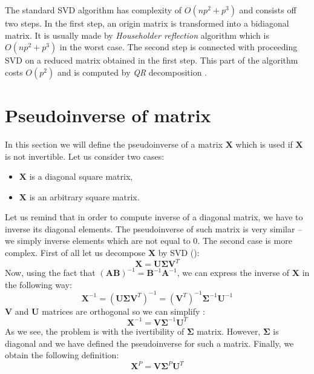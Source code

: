 \documentclass[english,a4paper,twoside]{ppfcmthesis}
\begin{document}
\begin{appendices}
The standard SVD algorithm has complexity of $O(np^2+p^3)$ and consists off two steps. In the first step, an origin matrix is transformed into a bidiagonal matrix. It is usually made by \textit{Householder reflection} algorithm which is $O(np^2+p^3)$ in the worst case. The second step is connected with proceeding SVD on a reduced matrix obtained in the first step. This part of the algorithm costs $O(p^2)$ and is computed by \textit{QR} decomposition \citep{Banerjee}. 

\newpage
\section{Pseudoinverse of matrix}\label{app:pseudo}

In this section we will define the pseudoinverse of a matrix $\boldsymbol{X}$ which is used if $\boldsymbol{X}$ is not invertible. Let us consider two cases: 
\begin{itemize}
    \item $\boldsymbol{X}$ is a diagonal square matrix,
    \item $\boldsymbol{X}$ is an arbitrary square matrix.
\end{itemize}
Let us remind that in order to compute inverse of a diagonal matrix, we have to inverse its diagonal elements. The pseudoinverse of such matrix is very similar -- we simply inverse elements which are not equal to $0$. The second case is more complex. First of all let us decompose $\boldsymbol{X}$ by SVD ():
\begin{equation}
    \boldsymbol{X}=\boldsymbol{U}\boldsymbol{\Sigma}{\boldsymbol{V}^T}
\end{equation}
Now, using the fact that $(\boldsymbol{A}\boldsymbol{B})^{-1}=\boldsymbol{B}^{-1}\boldsymbol{A}^{-1}$, we can express the inverse of $\boldsymbol{X}$ in the following way:
\begin{equation}\label{eq:invert}
    \boldsymbol{X}^{-1}=(\boldsymbol{U}\boldsymbol{\Sigma}{\boldsymbol{V}^T})^{-1}=(\boldsymbol{V}^T)^{-1}{\boldsymbol{\Sigma}}^{-1}\boldsymbol{U}^{-1}
\end{equation}
$\boldsymbol{V}$ and $\boldsymbol{U}$ matrices are orthogonal so we can simplify :
\begin{equation}
    \boldsymbol{X}^{-1}=\boldsymbol{V}{\boldsymbol{\Sigma}}^{-1}\boldsymbol{U}^T
\end{equation}
As we see, the problem is with the ivertibility of $\boldsymbol{\Sigma}$ matrix. However, $\boldsymbol{\Sigma}$ is diagonal and we have defined the pseudoinverse for such a matrix. Finally, we obtain the following definition:
\begin{equation}
    \boldsymbol{X}^P=\boldsymbol{V}\boldsymbol{\Sigma}^{P}{\boldsymbol{U}^T}
\end{equation}


\end{appendices}
\end{document}
